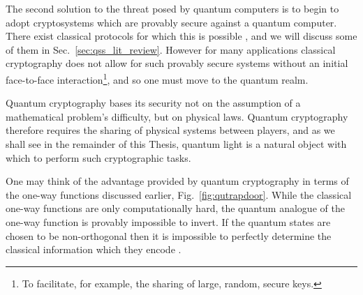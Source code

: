 
The second solution to the threat posed by quantum computers is to begin to adopt cryptosystems which are provably secure against a quantum computer. There exist classical protocols for which this is possible \cite{Shamir1979, Blakley1979}, and we will discuss some of them in Sec.~\ref{sec:qss_lit_review}. However for many applications classical cryptography does not allow for such provably secure systems without an initial face-to-face interaction\footnote{To facilitate, for example, the sharing of large, random, secure keys.}, and so one must move to the quantum realm.

Quantum cryptography bases its security not on the assumption of a mathematical problem's difficulty, but on physical laws. Quantum cryptography therefore requires the sharing of physical systems between players, and as we shall see in the remainder of this Thesis, quantum light is a natural object with which to perform such cryptographic tasks. 

One may think of the advantage provided by quantum cryptography in terms of the one-way functions discussed earlier, Fig.~\ref{fig:qutrapdoor}. While the classical one-way functions are only computationally hard, the quantum analogue of the one-way function is provably impossible to invert. If the quantum states are chosen to be non-orthogonal then it is impossible to perfectly determine the classical information which they encode \cite{Nielsen2010, brendon_book}.

